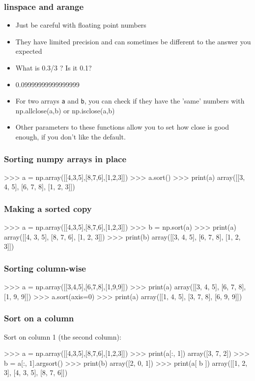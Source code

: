 \documentclass{beamer}
\begin{document}
\begin{frame}[fragile]
\frametitle{linspace and arange}
\begin{itemize}
\item Just be careful with floating point numbers
\item They have limited precision and can sometimes be different to
  the answer you expected
\item What is 0.3/3 ? Is it 0.1?
\item 0.09999999999999999
\item For two arrays \texttt{a} and \texttt{b}, you can check if they have the 'same'
  numbers with np.allclose(a,b) or np.isclose(a,b)
\item Other parameters to these functions allow you to set how close is good enough, if
  you don't like the default.
\end{itemize}
\end{frame}


\begin{frame}[fragile]
\frametitle{Sorting numpy arrays in place}
\begin{code}
>>> a = np.array([[4,3,5],[8,7,6],[1,2,3]]) 
>>> a.sort()
>>> print(a)
array([[3, 4, 5],
       [6, 7, 8],
       [1, 2, 3]])
\end{code}
\end{frame}

\begin{frame}[fragile]
\frametitle{Making a sorted copy}
\begin{code}
>>> a = np.array([[4,3,5],[8,7,6],[1,2,3]])
>>> b = np.sort(a)
>>> print(a)
array([[4, 3, 5],
       [8, 7, 6],
       [1, 2, 3]])
>>> print(b)
array([[3, 4, 5],
       [6, 7, 8],
       [1, 2, 3]])
\end{code}
\end{frame}

\begin{frame}[fragile]
\frametitle{{Sorting column-wise}}
\begin{code}
>>> a = np.array([[3,4,5],[6,7,8],[1,9,9]])
>>> print(a)
array([[3, 4, 5],
       [6, 7, 8],
       [1, 9, 9]])
>>> a.sort(axis=0)
>>> print(a)
array([[1, 4, 5],
       [3, 7, 8],
       [6, 9, 9]])
\end{code}
\end{frame}

\begin{frame}[fragile]
\frametitle{{Sort on a column}}
Sort on column 1 (the second column):
\begin{code}
>>> a = np.array([[4,3,5],[8,7,6],[1,2,3]])
>>> print(a[:, 1])
array([3, 7, 2])
>>> b = a[:, 1].argsort()
>>> print(b)
array([2, 0, 1])
>>> print(a[ b ])
array([[1, 2, 3],
       [4, 3, 5],
       [8, 7, 6]])
\end{code}
\end{frame}
\end{document}
